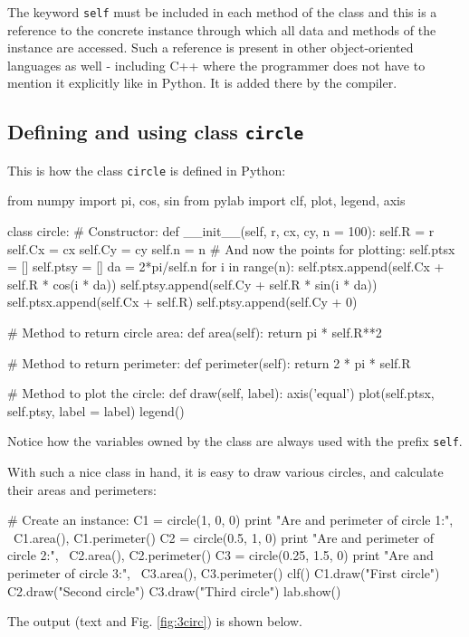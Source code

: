 The keyword {\tt self} must be included in each method of the class 
and this is a reference to the concrete instance through which all
data and methods of the instance are accessed. Such a reference is present 
in other object-oriented languages as well - including C++ where the programmer
does not have to mention it explicitly like in Python. It is added there by 
the compiler.

\subsection{Defining and using class {\tt circle}} \label{subsec:circle}

This is how the class {\tt circle} is defined in Python:

\begin{bluecode}
from numpy import pi, cos, sin
from pylab import clf, plot, legend, axis

class circle:
    # Constructor:
    def __init__(self, r, cx, cy, n = 100):
        self.R = r
        self.Cx = cx
        self.Cy = cy
        self.n = n
        # And now the points for plotting:
        self.ptsx = []
        self.ptsy = []
        da = 2*pi/self.n
        for i in range(n):
            self.ptsx.append(self.Cx + self.R * cos(i * da))
            self.ptsy.append(self.Cy + self.R * sin(i * da))
        self.ptsx.append(self.Cx + self.R)
        self.ptsy.append(self.Cy + 0)
            
    # Method to return circle area:
    def area(self):
        return pi * self.R**2
      
    # Method to return perimeter:
    def perimeter(self):
        return 2 * pi * self.R
      
    # Method to plot the circle:
    def draw(self, label):
        axis('equal')
        plot(self.ptsx, self.ptsy, label = label)
        legend()
\end{bluecode}
Notice how the variables owned by the class are always used with the 
prefix {\tt self}.

With such a nice class in hand, it is easy to draw various circles,
and calculate their areas and perimeters:
\begin{bluecode}        
# Create an instance:
C1 = circle(1, 0, 0)
print "Are and perimeter of circle 1:", \
C1.area(), C1.perimeter()
C2 = circle(0.5, 1, 0)
print "Are and perimeter of circle 2:", \
C2.area(), C2.perimeter()
C3 = circle(0.25, 1.5, 0)
print "Are and perimeter of circle 3:", \
C3.area(), C3.perimeter()
clf()
C1.draw("First circle")
C2.draw("Second circle")
C3.draw("Third circle")
lab.show()
\end{bluecode}
The output (text and Fig. \ref{fig:3circ}) is shown below.

